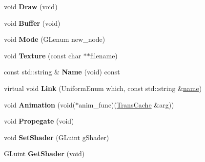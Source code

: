 \begin{DoxyCompactItemize}
\item 
\hypertarget{class_object_a3afa1b9af32b78d81b5de0836c511aeb}{void {\bfseries Draw} (void)}\label{class_object_a3afa1b9af32b78d81b5de0836c511aeb}

\item 
\hypertarget{class_object_a35c89a8eb8a5b742a9025331119bfc7c}{void {\bfseries Buffer} (void)}\label{class_object_a35c89a8eb8a5b742a9025331119bfc7c}

\item 
\hypertarget{class_object_ac6ccf69d21c4c902c62829c48ef6cf5b}{void {\bfseries Mode} (G\-Lenum new\-\_\-node)}\label{class_object_ac6ccf69d21c4c902c62829c48ef6cf5b}

\item 
\hypertarget{class_object_aa104adfbcc2cae4bd68c053cc3dab721}{void {\bfseries Texture} (const char $\ast$$\ast$filename)}\label{class_object_aa104adfbcc2cae4bd68c053cc3dab721}

\item 
\hypertarget{class_object_a890760dff9df547454112ff84510040c}{const std\-::string \& {\bfseries Name} (void) const }\label{class_object_a890760dff9df547454112ff84510040c}

\item 
\hypertarget{class_object_accde5aa6e8d0d582719e94c414c2341c}{virtual void {\bfseries Link} (Uniform\-Enum which, const std\-::string \&\hyperlink{class_object_a24457e0a387492c80594aec7681a2277}{name})}\label{class_object_accde5aa6e8d0d582719e94c414c2341c}

\item 
\hypertarget{class_object_ae3226b31c80c9f276ffdee65101c8fa6}{void {\bfseries Animation} (void($\ast$anim\-\_\-func)(\hyperlink{class_trans_cache}{Trans\-Cache} \&arg))}\label{class_object_ae3226b31c80c9f276ffdee65101c8fa6}

\item 
\hypertarget{class_object_a8fb20a8c2ad30c7d39c5396121bd210e}{void {\bfseries Propegate} (void)}\label{class_object_a8fb20a8c2ad30c7d39c5396121bd210e}

\item 
\hypertarget{class_scene_a3010030e68d0468b8d18c1323e072e80}{void {\bfseries Set\-Shader} (G\-Luint g\-Shader)}\label{class_scene_a3010030e68d0468b8d18c1323e072e80}

\item 
\hypertarget{class_scene_a1debf8bc8a9cb168ebbbcda1b4ffd605}{G\-Luint {\bfseries Get\-Shader} (void)}\label{class_scene_a1debf8bc8a9cb168ebbbcda1b4ffd605}


\end{DoxyCompactItemize}
